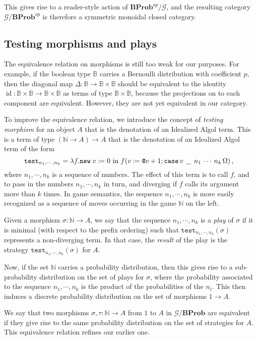 \documentclass{svproc}
\makeatletter
\newcommand\G{\mathcal{G}}
\DeclareMathOperator\id{id}
\newcommand{\test}{\texttt{test}}
\newcommand*\from{\colon}
\newcommand{\0}{{\mathtt{0}}} \newcommand{\com}{{\mathtt{com}}}
\newcommand{\deref}{\texttt{@}}
\newcommand{\new}{{\mathtt{new}}}
\renewcommand{\case}{{\mathtt{case}}}
\newcommand{\blank}{\;\underline{\hspace{1.5ex}}\;}
\newcommand{\catname}[1]{\mathbf{#1}}
\newcommand{\BProb}{\catname{BProb}}
\newcommand{\bN}{\mathbb{N}}
\newcommand{\bB}{\mathbb{B}}
\makeatother
\begin{document}
This gives rise to a reader-style action of $\BProb^{op}/\G$, and the resulting category $\G/\BProb^{op}$ is therefore a symmetric monoidal closed category.  

\subsection{Testing morphisms and plays}

The equivalence relation on morphisms is still too weak for our purposes.  
For example, if the boolean type $\bB$ carries a Bernoulli distribution with coefficient $p$, then the diagonal map $\Delta\from \bB\to \bB\times\bB$ should be equivalent to the identity $\id\from\bB\times\bB\to\bB\times\bB$ as terms of type $\bB\times\bB$, because the projections on to each component are equivalent.  
However, they are not yet equivalent in our category.  

To improve the equivalence relation, we introduce the concept of \emph{testing morphism} for an object $A$ that is the denotation of an Idealized Algol term.
This is a term of type $(\bN \to A) \to A$ that is the denotation of an Idealized Algol term of the form
\[
  \test_{n_1,\cdots,n_k} = \lambda f.\new\;v\coloneqq 0 \text{ in } f(v \coloneqq \deref v + 1; \case\,v\,\blank\,n_1\,\cdots\,n_k\,\Omega)\,,
  \]
where $n_1,\cdots,n_k$ is a sequence of numbers.  
The effect of this term is to call $f$, and to pass in the numbers $n_1,\cdots,n_k$ in turn, and diverging if $f$ calls its argument more than $k$ times.
In game semantics, the sequence $n_1,\cdots,n_k$ is more easily recognized as a sequence of moves occurring in the game $\bN$ on the left.  

Given a morphism $\sigma\from \bN \to A$, we say that the sequence $n_1,\cdots,n_k$ is a \emph{play} of $\sigma$ if it is minimal (with respect to the prefix ordering) such that $\test_{n_1,\cdots,n_k}(\sigma)$ represents a non-diverging term.
In that case, the \emph{result} of the play is the strategy $\test_{n_1,\cdots,n_k}(\sigma)$ for $A$.

Now, if the set $\bN$ carries a probability distribution, then this gives rise to a sub-probability distribution on the set of plays for $\sigma$, where the probability associated to the sequence $n_1,\cdots,n_k$ is the product of the probabilities of the $n_i$.  
This then induces a discrete probability distribution on the set of morphisms $1\to A$.

We say that two morphisms $\sigma,\tau\from \bN\to A$ from $1$ to $A$ in $\G/\BProb$ are equivalent if they give rise to the same probability distribution on the set of strategies for $A$.  
This equivalence relation refines our earlier one.
\end{document}
